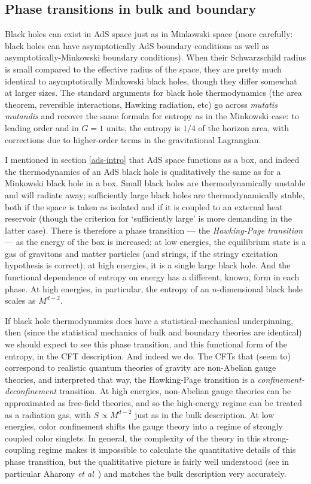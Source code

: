 \documentclass[12pt]{article}
\begin{document}
\subsection{Phase transitions in bulk and boundary}

Black holes can exist in AdS space just as in Minkowski space (more carefully: black holes can have asymptotically AdS boundary conditions as well as asymptotically-Minkowski boundary conditions). When their Schwarzschild radius is small compared to the effective radius of the space, they are pretty much identical to asymptotically Minkowski black holes, though they differ somewhat at larger sizes. The standard arguments for black hole thermodynamics (the area theorem, reversible interactions, Hawking radiation, etc) go across \emph{mutatis mutandis} and recover the same formula for entropy as in the Minkowski case: to leading order and in $G=1$ units, the entropy is $1/4$ of the horizon area, with corrections due to higher-order terms in the gravitational Lagrangian.

I mentioned in section \ref{ads-intro} that AdS space functions as a box, and indeed the thermodynamics of an AdS black hole is qualitatively the same as for a Minkowski black hole in a box. Small black holes are thermodynamically unstable and will radiate away; sufficiently large black holes are thermodynamically stable, both if the space is taken as isolated and if it is coupled to an external heat reservoir (though the criterion for `sufficiently large' is more demanding in the latter case). There is therefore a phase transition --- the \emph{Hawking-Page transition} \cite{hawkingpage} --- as the energy of the box is increased: at low energies, the equilibrium state is a gas of gravitons and matter particles (and strings, if the stringy excitation hypothesis is correct); at high energies, it is a single large black hole. And the functional dependence of entropy on energy has a different, known, form in each phase. At high energies, in particular, the entropy of an $n$-dimensional black hole scales as $M^{d-2}$. 

If black hole thermodynamics does have a statistical-mechanical underpinning, then (since the statistical mechanics of bulk and boundary theories are identical) we should expect to see this phase transition, and this functional form of the entropy, in the CFT description. And indeed we do. The CFTs that (seem to) correspond to realistic quantum theories of gravity are non-Abelian gauge theories, and interpreted that way, the Hawking-Page transition is a \emph{confinement-deconfinement} transition. At high energies, non-Abelian gauge theories can be approximated as free-field theories, and so the high-energy regime can be treated as a radiation gas, with $S\propto M^{d-2}$ just as in the bulk description. At low energies, color confinement shifts the gauge theory into a regime of strongly coupled color singlets. In general, the complexity of the theory in this strong-coupling regime makes it impossible to calculate the quantitative details of this phase transition, but the qualititative picture is fairly well understood (see in particular Aharony \emph{et al}~\citeyear{hagedorndeconfinementadscft}) and matches the bulk description very accurately.
\end{document}
